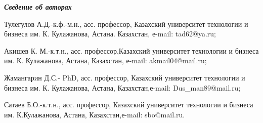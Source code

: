 \emph{{\bfseries Сведение об авторах}}

\begin{noparindent}
Тулегулов А.Д.-к.ф.-м.н., асс. профессор, Казахский университет
технологии и бизнеса им. К. Кулажанова, Астана. Казахстан, е-mail:
tad62@ya.ru;

Акишев К. М.-к.т.н., асс. профессор,Казахский университет технологии и
бизнеса им. К. Кулажанова, Астана, Казахстан, е-mail: akmail04@mail.ru;

Жамангарин Д.С.- PhD, асс. профессор, Казахский университет технологии и
бизнеса им. К. Кулажанова, Астана, Казахстан,е-mail: Dus\_man89@mail.ru;

Сатаев Б.О.-к.т.н., асс. профессор, Казахский университет технологии и
бизнеса им. К.Кулажанова, Астана, Казахстан,е-mail: sbo@mail.ru.
\end{noparindent}

